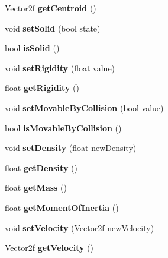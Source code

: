 \begin{DoxyCompactItemize}
Vector2f {\bfseries get\+Centroid} ()
\item 
\mbox{\label{class_polygon_a0fc684c823f560d066bc8fdfe10fd8f0}} 
void {\bfseries set\+Solid} (bool state)
\item 
\mbox{\label{class_polygon_a531b42b03e52789c8b9c6869933bf7d3}} 
bool {\bfseries is\+Solid} ()
\item 
\mbox{\label{class_polygon_a5325135466047ff1a8bb215905c54c83}} 
void {\bfseries set\+Rigidity} (float value)
\item 
\mbox{\label{class_polygon_a435f03ba82088fbde142d21950cfa1f3}} 
float {\bfseries get\+Rigidity} ()
\item 
\mbox{\label{class_polygon_ac379bd1b47a91b062cb1489f4be11b2e}} 
void {\bfseries set\+Movable\+By\+Collision} (bool value)
\item 
\mbox{\label{class_polygon_a83af7b70f89b8b27f5dc78f27dcd60d7}} 
bool {\bfseries is\+Movable\+By\+Collision} ()
\item 
\mbox{\label{class_polygon_a21749fb83e0fa8fd98cf646e0e4cbadc}} 
void {\bfseries set\+Density} (float new\+Density)
\item 
\mbox{\label{class_polygon_a93f38d702fe7c95af0ac72910c00908e}} 
float {\bfseries get\+Density} ()
\item 
\mbox{\label{class_polygon_a9c5d5b2df7caf0dc80b00fbcae0a74e2}} 
float {\bfseries get\+Mass} ()
\item 
\mbox{\label{class_polygon_af029d3b7c0e523ab07b376a193b6c7a3}} 
float {\bfseries get\+Moment\+Of\+Inertia} ()
\item 
\mbox{\label{class_polygon_ae404b76af51f552e3bc9dc57ea1d8985}} 
void {\bfseries set\+Velocity} (Vector2f new\+Velocity)
\item 
\mbox{\label{class_polygon_a82909752be649f103b26657aae3ff0c9}} 
Vector2f {\bfseries get\+Velocity} ()

\end{DoxyCompactItemize}
